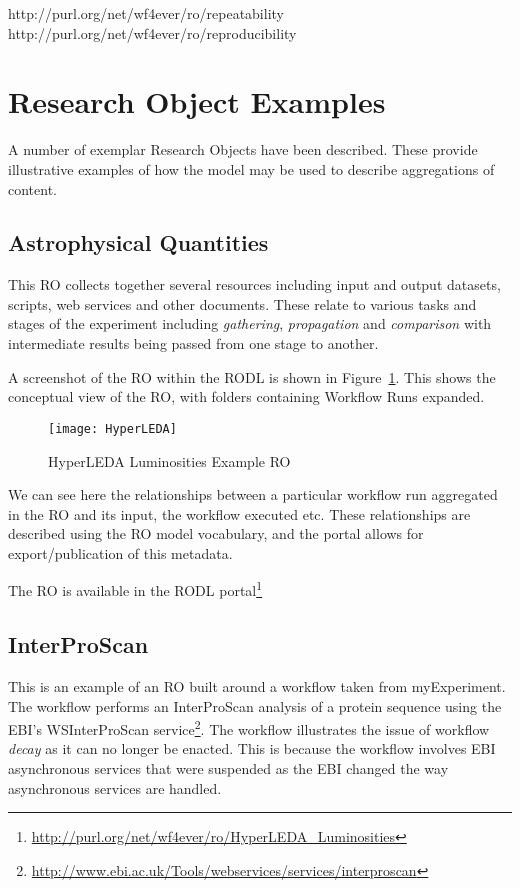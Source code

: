 
 http://purl.org/net/wf4ever/ro/repeatability
 http://purl.org/net/wf4ever/ro/reproducibility


\newcommand{\picwidth}{0.4\textwidth}

\section{Research Object Examples}
\label{sec:examples}

A number of exemplar Research Objects have been described. These
provide illustrative examples of how the model may be used to describe
aggregations of content. 

\subsection{Astrophysical Quantities}

This RO collects together several resources including input and output
datasets, scripts, web services and other documents. These relate to
various tasks and stages of the experiment including
\emph{gathering}, \emph{propagation} and \emph{comparison} with
intermediate results being passed from one stage to another. 

A screenshot of the RO within the RODL is shown in
Figure~\ref{fig:hyperleda}. This shows the conceptual view of the RO,
with folders containing Workflow Runs expanded.

\begin{figure}[ht]
  \centering
  \texttt{[image: HyperLEDA]}
  \caption{HyperLEDA Luminosities Example RO}
  \label{fig:hyperleda}
\end{figure}

We can see here the relationships between a particular workflow run
aggregated in the RO and its input, the workflow executed etc. These
relationships are described using the RO model vocabulary, and the
portal allows for export/publication of this metadata. 

The RO is available in the RODL
portal\footnote{\url{http://purl.org/net/wf4ever/ro/HyperLEDA_Luminosities}}

\subsection{InterProScan}

This is an example of an RO built around a workflow taken from
myExperiment. The workflow performs an InterProScan analysis of a
protein sequence using the EBI's WSInterProScan service\footnote{\url{
http://www.ebi.ac.uk/Tools/webservices/services/interproscan}}. The
workflow illustrates the issue of workflow \emph{decay} as it can no
longer be enacted. This is because the workflow involves EBI
asynchronous services that were suspended as the EBI changed the way
asynchronous services are handled. 

